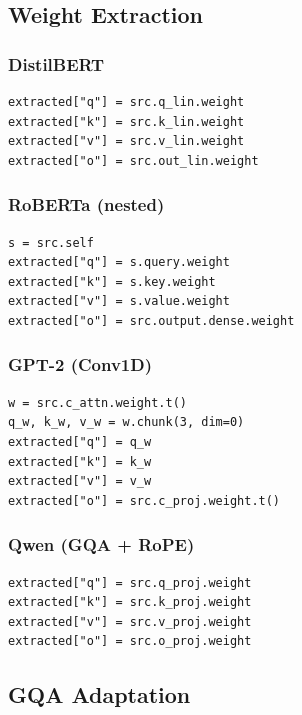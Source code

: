 \subsection{Weight Extraction}

\subsubsection{DistilBERT}

\begin{lstlisting}
extracted["q"] = src.q_lin.weight
extracted["k"] = src.k_lin.weight
extracted["v"] = src.v_lin.weight
extracted["o"] = src.out_lin.weight
\end{lstlisting}

\subsubsection{RoBERTa (nested)}

\begin{lstlisting}
s = src.self
extracted["q"] = s.query.weight
extracted["k"] = s.key.weight
extracted["v"] = s.value.weight
extracted["o"] = src.output.dense.weight
\end{lstlisting}

\subsubsection{GPT-2 (Conv1D)}

\begin{lstlisting}
w = src.c_attn.weight.t()
q_w, k_w, v_w = w.chunk(3, dim=0)
extracted["q"] = q_w
extracted["k"] = k_w
extracted["v"] = v_w
extracted["o"] = src.c_proj.weight.t()
\end{lstlisting}

\subsubsection{Qwen (GQA + RoPE)}

\begin{lstlisting}
extracted["q"] = src.q_proj.weight
extracted["k"] = src.k_proj.weight
extracted["v"] = src.v_proj.weight
extracted["o"] = src.o_proj.weight
\end{lstlisting}

\subsection{GQA Adaptation}

